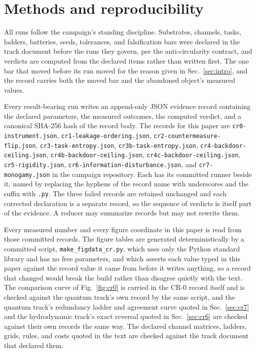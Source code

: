 \documentclass[aps,pre,reprint,nofootinbib]{revtex4-2}
\begin{document}
\section{Methods and reproducibility}
\label{sec:methods}

All runs follow the campaign's standing discipline.  Substrates,
channels, tasks, ladders, batteries, seeds, tolerances, and
falsification bars were declared in the track document before the runs
they govern, per the anti-circularity contract, and verdicts are
computed from the declared items rather than written first.  The one
bar that moved before its run moved for the reason given in
Sec.~\ref{sec:intro}, and the record carries both the moved bar and
the abandoned object's measured values.

Every result-bearing run writes an append-only JSON evidence record
containing the declared parameters, the measured outcomes, the
computed verdict, and a canonical SHA-256 hash of the record body.
The records for this paper are \texttt{cr0-\allowbreak instrument.json},
\texttt{cr1-\allowbreak leakage-\allowbreak ordering.json},
\texttt{cr2-\allowbreak countermeasure-\allowbreak flip.json},
\texttt{cr3-\allowbreak task-\allowbreak entropy.json},
\texttt{cr3b-\allowbreak task-\allowbreak entropy.json},
\texttt{cr4-\allowbreak backdoor-\allowbreak ceiling.json},
\texttt{cr4b-\allowbreak backdoor-\allowbreak ceiling.json},
\texttt{cr4c-\allowbreak backdoor-\allowbreak ceiling.json},
\texttt{cr5-\allowbreak rigidity.json},
\texttt{cr6-\allowbreak information-\allowbreak disturbance.json}, and
\texttt{cr7-\allowbreak monogamy.json} in
the campaign repository.  Each has its committed runner beside it,
named by replacing the hyphens of the record name with underscores
and the suffix with \texttt{.py}.
The three failed records are retained unchanged and
each corrected declaration is a separate record, so the sequence of
verdicts is itself part of the evidence.  A reducer may summarize
records but may not rewrite them.

Every measured number and every figure coordinate in this paper is
read from those committed records.  The figure tables are generated
deterministically by a committed script,
\texttt{make\_\allowbreak figdata\_\allowbreak cr.py},
which uses only the Python standard library and has no free
parameters, and which asserts each value typed in this paper against
the record value it came from before it writes anything, so a record
that changed would break the build rather than disagree quietly with
the text.  The comparison curve of Fig.~\ref{fig:cr0} is carried in
the CR-0 record itself and is checked against the quantum track's own
record by the same script, and the quantum track's redundancy ladder
and agreement curve quoted in Sec.~\ref{sec:cr7} and the hydrodynamic
track's exact reversal quoted in Sec.~\ref{sec:cr6} are checked
against their own records the same way.  The declared channel matrices,
ladders, grids, rules, and costs quoted in the text are checked
against the track document that declared them.
\end{document}
